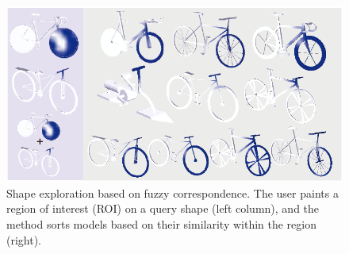 \begin{figure}[t]
\centering
    \includegraphics[width=1.0\columnwidth]{fig/img/kim_sig12_fc}
    \caption{Shape exploration based on fuzzy correspondence. The user paints a region of interest (ROI) on a query shape (left column), and the method
    sorts models based on their similarity within the region (right).}
    \label{fig:kim_sig12_fc}
\end{figure}

